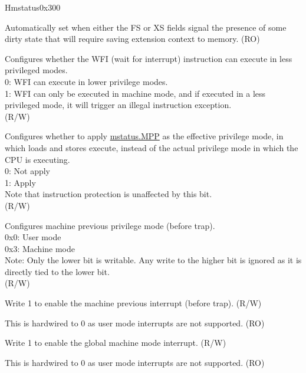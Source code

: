 \begin{register}{H}{mstatus}{0x300}\label{regdesc:MSTATUS}
%
%
%
%
%
%
%
%
%
%
%
%
%
%
%
\regnewline%
\begin{regdesc}\begin{reglist}
\label{fielddesc:MSTATUS_SD}\item [SD] Automatically set when either the FS or XS fields signal the presence of some dirty state that will require saving extension context to memory. (RO)
\label{fielddesc:MSTATUSTW}\item [TW] Configures whether the WFI (wait for interrupt) instruction can execute in less privileged modes. \\
0: WFI can execute in lower privilege modes.\\
1: WFI can only be executed in machine mode, and if executed in a less privileged mode, it will trigger an illegal instruction exception.\\
(R/W)
\label{fielddesc:MSTATUS_MPRV}\item [MPRV] Configures whether to apply \hyperref[fielddesc:MSTATUSMPP]{mstatus.MPP} as the effective privilege mode, in which loads and stores execute, instead of the actual privilege mode in which the CPU is executing. \\
0: Not apply\\
1: Apply\\
Note that instruction protection is unaffected by this bit.\\
(R/W)
\label{fielddesc:MSTATUSMPP}\item [MPP] Configures machine previous privilege mode (before trap).\\
0x0: User mode\\
0x3: Machine mode\\
Note: Only the lower bit is writable. Any write to the higher bit is ignored as it is directly tied to the lower bit.\\
(R/W)
\label{fielddesc:MSTATUSMPIE}\item [MPIE] Write 1 to enable the machine previous interrupt (before trap). (R/W)
\label{fielddesc:MSTATUSUPIE}\item [UPIE] This is hardwired to 0 as user mode interrupts are not supported. (RO)
\label{fielddesc:MSTATUSMIE}\item [MIE] Write 1 to enable the global machine mode interrupt. (R/W)
\label{fielddesc:MSTATUSUIE}\item [UIE] This is hardwired to 0 as user mode interrupts are not supported. (RO)
\end{reglist}\end{regdesc}
\end{register}

